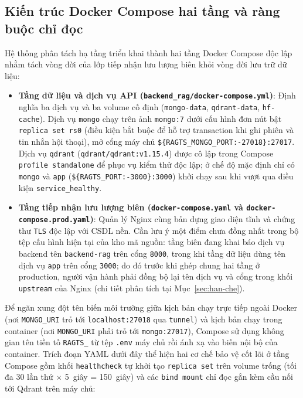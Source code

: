 \subsection{Kiến trúc Docker Compose hai tầng và ràng buộc chỉ đọc}
\label{subsec:kien-truc-compose}

Hệ thống phân tách hạ tầng triển khai thành hai tầng Docker Compose độc lập nhằm tách vòng đời của lớp tiếp nhận lưu lượng biên khỏi vòng đời lưu trữ dữ liệu:

\begin{itemize}[label=--]
    \item \textbf{Tầng dữ liệu và dịch vụ API (\texttt{backend\_\allowbreak{}rag/\allowbreak{}docker-\allowbreak{}compose.\allowbreak{}yml})}: Định nghĩa ba dịch vụ và ba volume cố định (\texttt{mongo-\allowbreak{}data}, \texttt{qdrant-\allowbreak{}data}, \texttt{hf-\allowbreak{}cache}). Dịch vụ \texttt{mongo} chạy trên ảnh \texttt{mongo:\allowbreak{}7} dưới cấu hình đơn nút bật \texttt{replica set rs0} (điều kiện bắt buộc để hỗ trợ transaction khi ghi phiên và tin nhắn hội thoại), mở cổng máy chủ \texttt{\$\{RAGTS\_\allowbreak{}MONGO\_\allowbreak{}PORT:\allowbreak{}-\allowbreak{}27018\}:\allowbreak{}27017}. Dịch vụ \texttt{qdrant} (\texttt{qdrant/\allowbreak{}qdrant:\allowbreak{}v1.\allowbreak{}15.\allowbreak{}4}) được cô lập trong Compose \texttt{profile standalone} để phục vụ kiểm thử độc lập; ở chế độ mặc định chỉ có \texttt{mongo} và \texttt{app} (\texttt{\$\{RAGTS\_\allowbreak{}PORT:\allowbreak{}-\allowbreak{}3000\}:\allowbreak{}3000}) khởi chạy sau khi vượt qua điều kiện \texttt{service\_\allowbreak{}healthy}.
    \item \textbf{Tầng tiếp nhận lưu lượng biên (\texttt{docker-\allowbreak{}compose.\allowbreak{}yaml} và \texttt{docker-\allowbreak{}compose.\allowbreak{}prod.\allowbreak{}yaml})}: Quản lý Nginx cùng bản dựng giao diện tĩnh và chứng thư \texttt{TLS} độc lập với CSDL nền. Cần lưu ý một điểm chưa đồng nhất trong bộ tệp cấu hình hiện tại của kho mã nguồn: tầng biên đang khai báo dịch vụ backend tên \texttt{backend-\allowbreak{}rag} trên cổng \texttt{8000}, trong khi tầng dữ liệu dùng tên dịch vụ \texttt{app} trên cổng \texttt{3000}; do đó trước khi ghép chung hai tầng ở production, người vận hành phải đồng bộ lại tên dịch vụ và cổng trong khối \texttt{upstream} của Nginx (chi tiết phân tích tại Mục~\ref{sec:han-che}).
\end{itemize}

Để ngăn xung đột tên biến môi trường giữa kịch bản chạy trực tiếp ngoài Docker (nơi \texttt{MONGO\_\allowbreak{}URI} trỏ tới \texttt{localhost:\allowbreak{}27018} qua \texttt{tunnel}) và kịch bản chạy trong container (nơi \texttt{MONGO\_\allowbreak{}URI} phải trỏ tới \texttt{mongo:\allowbreak{}27017}), Compose sử dụng không gian tên tiền tố \texttt{RAGTS\_\allowbreak{}} từ tệp \texttt{.\allowbreak{}env} máy chủ rồi ánh xạ vào biến nội bộ của container. Trích đoạn YAML dưới đây thể hiện hai cơ chế bảo vệ cốt lõi ở tầng Compose gồm khối \texttt{healthcheck} tự khởi tạo \texttt{replica set} trên volume trống (tối đa 30 lần thử $\times$ 5~giây = 150~giây) và các \texttt{bind mount} chỉ đọc gắn kèm cầu nối tới Qdrant trên máy chủ:

